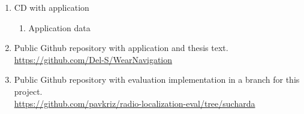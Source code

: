 \label{sec:Attachments}
\begin{enumerate}
	\item CD with application
	\begin{enumerate}
		\item Application data
	\end{enumerate}
	\item Public Github repository with application and thesis text.
	\\ \url{https://github.com/Del-S/WearNavigation}
	\item Public Github repository with evaluation implementation in a branch for this project.
	\\ \url{https://github.com/pavkriz/radio-localization-eval/tree/sucharda}
\end{enumerate}